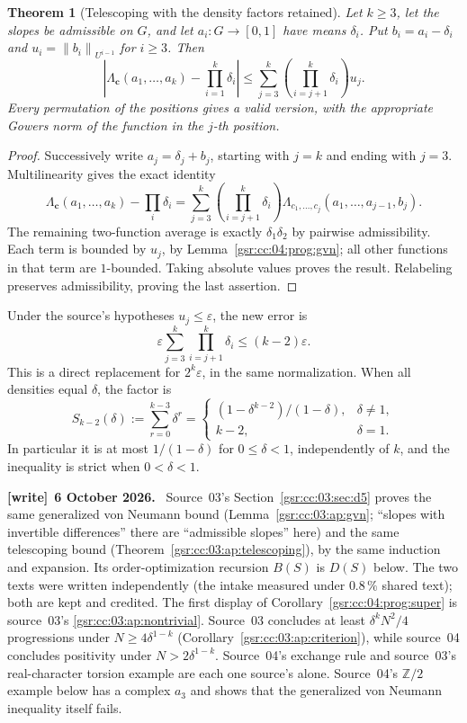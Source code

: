 \documentclass[11pt,letterpaper]{article}
\numberwithin{equation}{section}
\newtheorem{theorem}{Theorem}[section]
\theoremstyle{definition}
\theoremstyle{remark}
\newcommand{\Z}{\mathbb Z}
\newcommand{\1}{\mathbf 1}
\newcommand{\norm}[1]{\left\|#1\right\|}
\newenvironment{writenote}[1][]{\par\smallskip\begingroup\small
 \noindent\textbf{[write]}\if\relax\detokenize{#1}\relax\else~\textbf{#1.}\fi\ }%
 {\par\endgroup\smallskip}
\begin{document}
\begin{theorem}[Telescoping with the density factors retained]
\label{gsr:cc:04:prog:telescoping}
Let \(k\geq3\), let the slopes be admissible on \(G\), and let
\(a_i:G\to[0,1]\) have means \(\delta_i\).  Put
\(b_i=a_i-\delta_i\) and \(u_i=\norm{b_i}_{U^{i-1}}\) for \(i\geq3\).
Then
\[
 \left|\Lambda_{\mathbf c}(a_1,\ldots,a_k)-\prod_{i=1}^k\delta_i\right|
 \leq
 \sum_{j=3}^k
    \left(\prod_{i=j+1}^k\delta_i\right)u_j.
 \tag{\(\ast\)}\label{gsr:cc:04:prog:weightedbound}
\]
Every permutation of the positions gives a valid version, with the
appropriate Gowers norm of the function in the \(j\)-th position.
\end{theorem}

\begin{proof}
Successively write \(a_j=\delta_j+b_j\), starting with \(j=k\) and
ending with \(j=3\).  Multilinearity gives the exact identity
\[
 \Lambda_{\mathbf c}(a_1,\ldots,a_k)-\prod_i\delta_i
 =
 \sum_{j=3}^k
 \left(\prod_{i=j+1}^k\delta_i\right)
 \Lambda_{c_1,\ldots,c_j}(a_1,\ldots,a_{j-1},b_j).
\]
The remaining two-function average is exactly \(\delta_1\delta_2\)
by pairwise admissibility.  Each term is bounded by \(u_j\), by
Lemma~\ref{gsr:cc:04:prog:gvn}; all other functions in that term are \(1\)-bounded.
Taking absolute values proves the result.  Relabeling preserves
admissibility, proving the last assertion.
\end{proof}

Under the source's hypotheses \(u_j\leq\varepsilon\), the new error is
\[
 \varepsilon\sum_{j=3}^k\prod_{i=j+1}^k\delta_i
 \leq(k-2)\varepsilon.
\]
This is a direct replacement for \(2^k\varepsilon\), in the same
normalization.  When all densities equal \(\delta\), the factor is
\[
 S_{k-2}(\delta):=\sum_{r=0}^{k-3}\delta^r
 =\begin{cases}
 (1-\delta^{k-2})/(1-\delta),&\delta\ne1,\\
 k-2,&\delta=1.
 \end{cases}
\]
In particular it is at most \(1/(1-\delta)\) for \(0\leq\delta<1\),
independently of \(k\), and the inequality is strict when \(0<\delta<1\).
\begin{writenote}[6 October 2026]
Source~03's Section~\ref{gsr:cc:03:sec:d5} proves the same generalized von Neumann bound (Lemma~\ref{gsr:cc:03:ap:gvn}; ``slopes with invertible differences'' there are ``admissible slopes'' here) and the same telescoping bound (Theorem~\ref{gsr:cc:03:ap:telescoping}), by the same induction and expansion. Its order-optimization recursion $B(S)$ is $D(S)$ below. The two texts were written independently (the intake measured under $0.8\,\%$ shared text); both are kept and credited. The first display of Corollary~\ref{gsr:cc:04:prog:super} is source~03's \eqref{gsr:cc:03:ap:nontrivial}. Source~03 concludes at least $\delta^kN^2/4$ progressions under $N\ge4\delta^{1-k}$ (Corollary~\ref{gsr:cc:03:ap:criterion}), while source~04 concludes positivity under $N>2\delta^{1-k}$. Source~04's exchange rule and source~03's real-character torsion example are each one source's alone. Source~04's $\Z/2$ example below has a complex $a_3$ and shows that the generalized von Neumann inequality itself fails.
\end{writenote}
\end{document}
